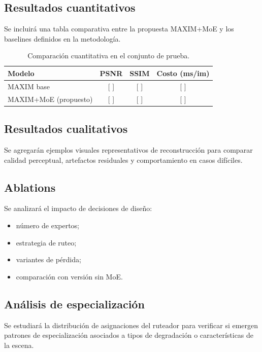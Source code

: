 \documentclass[aps,prl,twocolumn,groupedaddress]{revtex4-2}
\begin{document}
\subsection{Resultados cuantitativos}

Se incluirá una tabla comparativa entre la propuesta MAXIM+MoE y los baselines definidos en la metodología.

\begin{table}[ht]
\caption{Comparación cuantitativa en el conjunto de prueba.}
\begin{ruledtabular}
\begin{tabular}{lccc}
Modelo & PSNR & SSIM & Costo (ms/im) \\
\hline
MAXIM base & [ ] & [ ] & [ ] \\
MAXIM+MoE (propuesto) & [ ] & [ ] & [ ] \\
\end{tabular}
\end{ruledtabular}
\end{table}

\subsection{Resultados cualitativos}

Se agregarán ejemplos visuales representativos de reconstrucción para comparar calidad perceptual, artefactos residuales y comportamiento en casos difíciles.

\subsection{Ablations}

Se analizará el impacto de decisiones de diseño:
\begin{itemize}
    \item número de expertos;
    \item estrategia de ruteo;
    \item variantes de pérdida;
    \item comparación con versión sin MoE.
\end{itemize}

\subsection{Análisis de especialización}

Se estudiará la distribución de asignaciones del ruteador para verificar si emergen patrones de especialización asociados a tipos de degradación o características de la escena.
\end{document}
